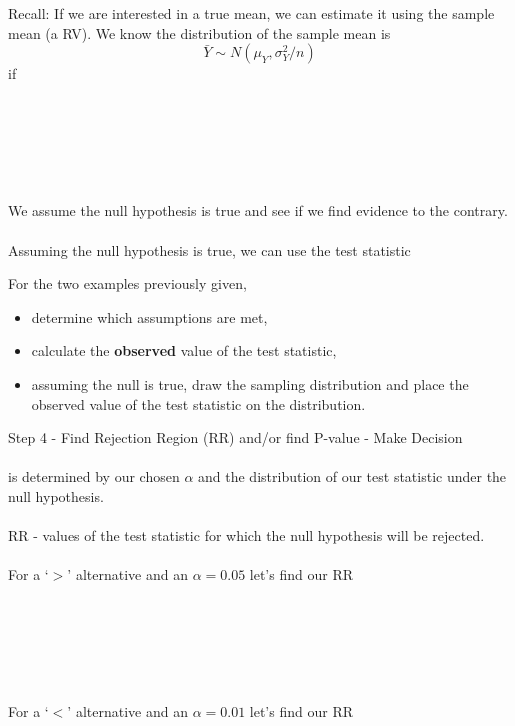 Recall:  If we are interested in a true mean, we can estimate it using the sample mean (a RV).  We know the distribution of the sample mean is 
$$\bar{Y}\sim N(\mu_Y,\sigma^2_Y/n)$$ 
if\\~\\~\\~\\~\\~\\~\\

We assume the null hypothesis is true and see if we find evidence to the contrary.\\~\\
Assuming the null hypothesis is true, we can use the test statistic

\newpage

For the two examples previously given, 
\begin{itemize}
\item determine which assumptions are met,
\item calculate the \textbf{observed} value of the test statistic,
\item assuming the null is true, draw the sampling distribution and place the observed value of the test statistic on the distribution.
\end{itemize}

\newpage

\large Step 4 - Find Rejection Region (RR) and/or find P-value - Make Decision\normalsize\\~\\
\underbar{~~~~~~~~~~~~~~~~~~~~~~~~~~~~~~~~~~~~~~~~~~~~~~~~} is determined by our chosen $\alpha$ and the distribution of our test statistic under the null hypothesis.\\~\\
RR - values of the test statistic for which the null hypothesis will be rejected.\\~\\
For a `$>$' alternative and an $\alpha=0.05$ let's find our RR\\~\\~\\~\\~\\~\\~\\

For a `$<$' alternative and an $\alpha=0.01$ let's find our RR\\~\\~\\~\\~\\~\\~\\


